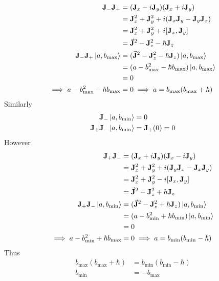 \documentclass[12pt,a4paper,titlepage]{article}
\newcommand{\trm}[1]{\textrm{#1}} %
\begin{document}
\begin{equation}
\begin{aligned}
\vb{J}_{-}\vb{J}_{+}&=(\vb{J}_{x}-i\vb{J}_{y})(\vb{J}_{x}+i\vb{J}_{y})\\
&=\vb{J}_{x}^{2}+\vb{J}_{y}^{2}+i(\vb{J}_{x}\vb{J}_{y}-\vb{J}_{y}\vb{J}_{x})\\
&=\vb{J}_{x}^{2}+\vb{J}_{y}^{2}+i\comm{\vb{J}_{x}}{\vb{J}_{y}}\\
&=\vec{\vb{J}}^{2}-\vb{J}_{z}^{2}-\hbar\vb{J}_{z}\\
\vb{J}_{-}\vb{J}_{+}\ket{a,b_{\trm{max}}}&=(\vec{\vb{J}}^{2}-\vb{J}_{z}^{2}-\hbar\vb{J}_{z})\ket{a,b_{\trm{max}}}\\
&=(a-b_{\trm{max}}^{2}-\hbar b_{\trm{max}})\ket{a,b_{\trm{max}}}\\
&=0\\
\implies a-b_{\trm{max}}^{2}-\hbar b_{\trm{max}}&=0\implies a= b_{\trm{max}}(b_{\trm{max}}+\hbar)
\end{aligned}
\end{equation}
Similarly
\begin{equation}
\begin{aligned}
\vb{J}_{-}\ket{a,b_{\trm{min}}}&=0\\
\vb{J}_{+}\vb{J}_{-}\ket{a,b_{\trm{min}}}&=\vb{J}_{+}(0)=0
\end{aligned}
\end{equation}
However
\begin{equation}
\begin{aligned}
\vb{J}_{+}\vb{J}_{-}&=(\vb{J}_{x}+i\vb{J}_{y})(\vb{J}_{x}-i\vb{J}_{y})\\
&=\vb{J}_{x}^{2}+\vb{J}_{y}^{2}+i(\vb{J}_{y}\vb{J}_{x}-\vb{J}_{x}\vb{J}_{y})\\
&=\vb{J}_{x}^{2}+\vb{J}_{y}^{2}-i\comm{\vb{J}_{x}}{\vb{J}_{y}}\\
&=\vec{\vb{J}}^{2}-\vb{J}_{z}^{2}+\hbar\vb{J}_{z}\\
\vb{J}_{+}\vb{J}_{-}\ket{a,b_{\trm{min}}}&=(\vec{\vb{J}}^{2}-\vb{J}_{z}^{2}+\hbar\vb{J}_{z})\ket{a,b_{\trm{min}}}\\
&=(a-b_{\trm{min}}^{2}+\hbar b_{\trm{min}})\ket{a,b_{\trm{min}}}\\
&=0\\
\implies a-b_{\trm{min}}^{2}+\hbar b_{\trm{max}}&=0\implies a= b_{\trm{min}}(b_{\trm{min}}-\hbar)
\end{aligned}
\end{equation}
Thus
\begin{equation}
\begin{aligned}
b_{\trm{max}}(b_{\trm{max}}+\hbar)&=b_{\trm{min}}(b_{\trm{min}}-\hbar)\\
b_{\trm{min}}&=-b_{\trm{max}}
\end{aligned}
\end{equation}
\end{document}
